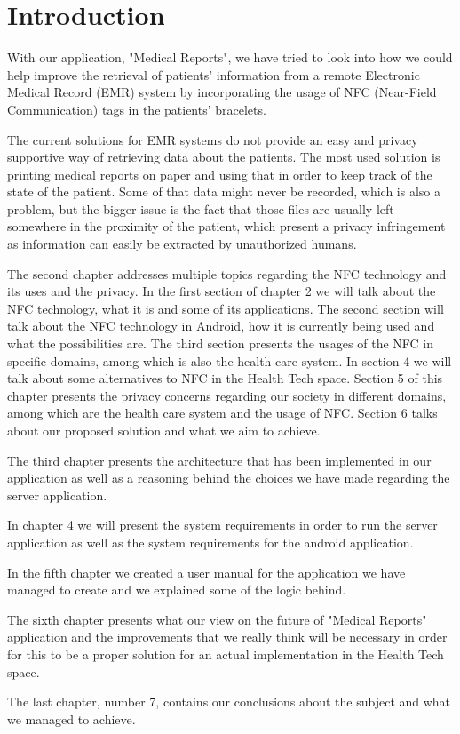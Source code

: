 \chapter{Introduction}
\label{intro}

\par With our application, "Medical Reports", we have tried to look into how we could help improve the retrieval of patients' information from a remote Electronic Medical Record (EMR) system by incorporating the usage of NFC (Near-Field Communication) tags in the patients' bracelets.

The current solutions for EMR systems do not provide an easy and privacy supportive way of retrieving data about the patients. The most used solution is printing medical reports on paper and using that in order to keep track of the state of the patient. Some of that data might never be recorded, which is also a problem, but the bigger issue is the fact that those files are usually left somewhere in the proximity of the patient, which present a privacy infringement as information can easily be extracted by unauthorized humans.

The second chapter addresses multiple topics regarding the NFC technology and its uses and the privacy. In the first section of chapter 2 we will talk about the NFC technology, what it is and some of its applications. The second section will talk about the NFC technology in Android, how it is currently being used and what the possibilities are. The third section presents the usages of the NFC in specific domains, among which is also the health care system. In section 4 we will talk about some alternatives to NFC in the Health Tech space. Section 5 of this chapter presents the privacy concerns regarding our society in different domains, among which are the health care system and the usage of NFC. Section 6 talks about our proposed solution and what we aim to achieve.

The third chapter presents the architecture that has been implemented in our application as well as a reasoning behind the choices we have made regarding the server application.

In chapter 4 we will present the system requirements in order to run the server application as well as the system requirements for the android application.

In the fifth chapter we created a user manual for the application we have managed to create and we explained some of the logic behind.

The sixth chapter presents what our view on the future of "Medical Reports" application and the improvements that we really think will be necessary in order for this to be a proper solution for an actual implementation in the Health Tech space.

The last chapter, number 7, contains our conclusions about the subject and what we managed to achieve.